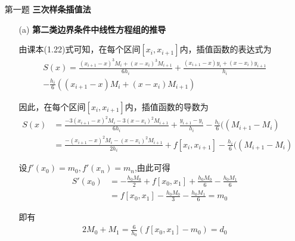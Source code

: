 \documentclass[12pt,a4paper,utf8]{ctexart}
\begin{document}
\begin{enumerate}
\item[第一题] \textbf{三次样条插值法}

    \begin{itemize}
    \item [(a)] \textbf{第二类边界条件中线性方程组的推导}
    \par
    由课本(1.22)式可知，在每个区间$[x_i,x_{i+1}]$内，插值函数的表达式为
    \begin{equation}
        \begin{aligned}
        S(x) = \frac{ (x_{i+1} - x)^3 M_i + (x - x_i)^3 M_{i+1} }{6 h_i}  
            +  \frac{ (x_{i+1} - x) y_i + (x - x_i) y_{i+1} }{ h_i} \\
            - \frac{h_i}{6}( (x_{i+1} - x)M_i + (x - x_i)M_{i+1} ) \label{S}
        \end{aligned}
    \end{equation}

    \par
    因此，在每个区间$[x_i,x_{i+1}]$内，插值函数的导数为
    \begin{equation}
        \begin{aligned}
        S(x) &= \frac{ -3(x_{i+1} - x)^2 M_i - 3(x - x_i)^2 M_{i+1} }{6 h_i}  
            +  \frac{ y_{i+1} - y_i }{ h_i} 
            - \frac{h_i}{6}( ( M_{i+1} - M_i ) \\
            &=  \frac{ -(x_{i+1} - x)^2 M_i - (x - x_i)^2 M_{i+1} }{2 h_i}
            +  f[x_i,x_{i+1}] - \frac{h_i}{6}( ( M_{i+1} - M_i ) \label{S'}
        \end{aligned}
    \end{equation}
    \par
    设$f'(x_0) = m_0,f'(x_n) = m_n$,由此可得
    \begin{equation}
      \begin{aligned}
      S'(x_0) &= -\frac{h_0 M_0}{2} + f[x_0,x_1] + \frac{h_0M_0}{6} - \frac{h_0M_1}{6} \\
      &= f[x_0,x_1] - \frac{h_0M_0}{3} - \frac{h_0M_1}{6} 
       = m_0 \label{S'(x_0)}
      \end{aligned}
    \end{equation}
    \par
    即有
    \begin{equation}
      \begin{aligned}
      2 M_0 + M_1 = \frac{6}{h_0}(f[x_0,x_1] - m_0) = d_0
      \end{aligned}
    \end{equation}


\end{itemize}
\end{enumerate}
\end{document}
